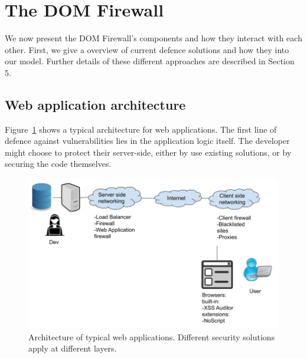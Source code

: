 \section{The DOM Firewall}

We now present the DOM Firewall's components and how they interact with each other. First, we give a overview of current defence solutions and how they into our model. Further details of these different approaches are described in Section 5.

\subsection{Web application architecture}
Figure~\ref{fig:web_architecture} shows a typical architecture for web applications. The first line of defence against vulnerabilities lies in the application logic itself. The developer might choose to protect their server-side, either by use existing solutions, or by securing the code themselves. 
\begin{figure}[h]
	\includegraphics[scale=0.3]{img/web_architecture.png}
	\caption{Architecture of typical web applications. Different security solutions apply at different layers.}
	\label{fig:web_architecture}
\end{figure}


